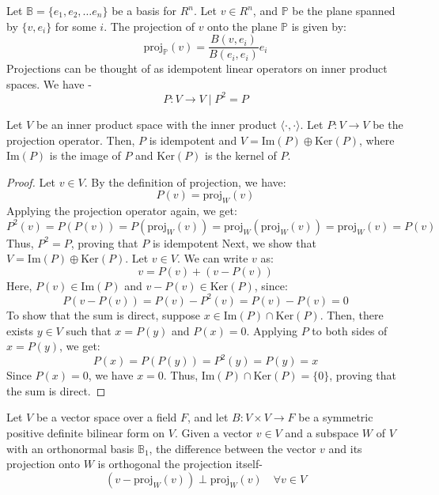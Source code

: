 \documentclass[openany]{book}
\begin{document}
Let $\mathbb{B} = \{e_1, e_2, \ldots e_n\}$ be a basis for $R^n$. Let $v \in R^n$, and $\mathbb{P}$ be the plane spanned by $\{v, e_i\}$ for some $i$. The projection of $v$ onto the plane $\mathbb{P}$ is given by:
$$\text{proj}_{\mathbb{P}}(v) = \frac{B(v, e_i)}{B(e_i, e_i)} e_i$$  
Projections can be thought of as idempotent linear operators on inner product spaces. We have - 
$$P: V \to V \mid P^2 = P$$
\begin{mytheorem}
    Let $V$ be an inner product space with the inner product $\langle \cdot, \cdot \rangle$. Let $P: V \to V$ be the projection operator. Then, $P$ is idempotent and $V = \text{Im}(P) \oplus \text{Ker}(P)$, where $\text{Im}(P)$ is the image of $P$ and $\text{Ker}(P)$ is the kernel of $P$.
\end{mytheorem}
\begin{proof}
    Let $v \in V$. By the definition of projection, we have:
    $$P(v) = \text{proj}_W(v)$$
    Applying the projection operator again, we get:
    $$P^2(v) = P(P(v)) = P(\text{proj}_W(v)) = \text{proj}_W(\text{proj}_W(v)) = \text{proj}_W(v) = P(v)$$
    Thus, $P^2 = P$, proving that $P$ is idempotent
    Next, we show that $V = \text{Im}(P) \oplus \text{Ker}(P)$. Let $v \in V$. We can write $v$ as:
    $$v = P(v) + (v - P(v))$$
    Here, $P(v) \in \text{Im}(P)$ and $v - P(v) \in \text{Ker}(P)$, since:
    $$P(v - P(v)) = P(v) - P^2(v) = P(v) - P(v) = 0$$
    To show that the sum is direct, suppose $x \in \text{Im}(P) \cap \text{Ker}(P)$. Then, there exists $y \in V$ such that $x = P(y)$ and $P(x) = 0$. Applying $P$ to both sides of $x = P(y)$, we get:
    $$P(x) = P(P(y)) = P^2(y) = P(y) = x$$
    Since $P(x) = 0$, we have $x = 0$. Thus, $\text{Im}(P) \cap \text{Ker}(P) = \{0\}$, proving that the sum is direct.
\end{proof}
\begin{mytheorem}
Let $V$ be a vector space over a field $F$, and let $B: V \times V \to F$ be a symmetric positive definite bilinear form on $V$. Given a vector $v \in V$ and a subspace $W$ of $V$ with an orthonormal basis $\mathbb{B}_1$, the difference between the vector $v$ and its projection onto $W$ is orthogonal the projection itself-  
$$(v - \text{proj}_W(v)) \perp \text{proj}_W(v) \quad \forall v \in V$$
\end{mytheorem}
\end{document}
